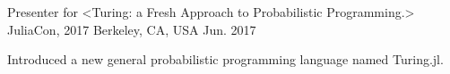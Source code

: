 

\begin{cventries}

  \cventry
    {Presenter for <Turing: a Fresh Approach to Probabilistic Programming.>} %
    {JuliaCon, 2017} %
    {Berkeley, CA, USA} %
    {Jun. 2017} %
    {
      \begin{cvitems} %
        \item {Introduced a new general probabilistic programming language named Turing.jl.}
      \end{cvitems}
    }

\end{cventries}
